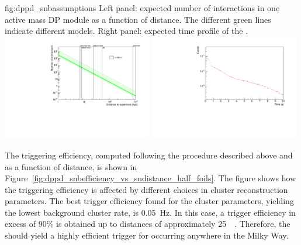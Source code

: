 \begin{dunefigure}{fig:dppd_snbassumptions}
     {Left panel: expected number of  \nue {} interactions in one \dpactivelarmass active mass DP module as a function of  distance. The different green lines indicate different  models. Right panel: expected time profile of the .}
    \includegraphics[width=0.49\textwidth]{graphics/dppd_events_vs_sndistance.pdf} \hfill
    \includegraphics[width=0.49\textwidth]{graphics/dppd_sntime_profile.pdf} 
    \end{dunefigure}

The  triggering efficiency, computed following the procedure described above and as a function of  distance, is shown in Figure~\ref{fig:dppd_snbefficiency_vs_sndistance_half_foils}. The figure shows how the  triggering efficiency is affected by different choices in cluster reconstruction parameters. The best trigger efficiency found for the cluster parameters, yielding the lowest background cluster rate, is \SI{0.05}{\Hz}. In this case, a trigger efficiency in excess of \num{90}\% is obtained up to  distances of approximately \SI{25}{\kilo\parsec}. Therefore, the  should yield a highly efficient trigger for  occurring anywhere in the Milky Way. 

